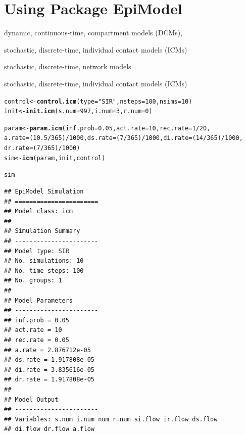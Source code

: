 \documentclass{article}\usepackage[]{graphicx}\usepackage[]{color}
\makeatletter
\newcommand{\hlnum}[1]{\textcolor[rgb]{0.686,0.059,0.569}{#1}}%
\newcommand{\hlstr}[1]{\textcolor[rgb]{0.192,0.494,0.8}{#1}}%
\newcommand{\hlopt}[1]{\textcolor[rgb]{0,0,0}{#1}}%
\newcommand{\hlstd}[1]{\textcolor[rgb]{0.345,0.345,0.345}{#1}}%
\newcommand{\hlkwb}[1]{\textcolor[rgb]{0.69,0.353,0.396}{#1}}%
\newcommand{\hlkwc}[1]{\textcolor[rgb]{0.333,0.667,0.333}{#1}}%
\newcommand{\hlkwd}[1]{\textcolor[rgb]{0.737,0.353,0.396}{\textbf{#1}}}%
\newenvironment{kframe}{%
 \def\at@end@of@kframe{}%
 \ifinner\ifhmode%
  \def\at@end@of@kframe{\end{minipage}}%
  \begin{minipage}{\columnwidth}%
 \fi\fi%
 \def\FrameCommand##1{\hskip\@totalleftmargin \hskip-\fboxsep
 \colorbox{shadecolor}{##1}\hskip-\fboxsep
     \hskip-\linewidth \hskip-\@totalleftmargin \hskip\columnwidth}%
 \MakeFramed {\advance\hsize-\width
   \@totalleftmargin\z@ \linewidth\hsize
   \@setminipage}}%
 {\par\unskip\endMakeFramed%
 \at@end@of@kframe}
\newenvironment{knitrout}{}{} %
\makeatother
\begin{document}
\section{Using Package EpiModel}


dynamic, continuous-time, compartment models (DCMs), 

stochastic, discrete-time, individual contact models (ICMs)

stochastic, discrete-time, network models



stochastic, discrete-time, individual contact models (ICMs)

\begin{knitrout}
\color{fgcolor}\begin{kframe}
\begin{alltt}
\hlstd{control} \hlkwb{<-} \hlkwd{control.icm}\hlstd{(}\hlkwc{type} \hlstd{=} \hlstr{"SIR"}\hlstd{,} \hlkwc{nsteps} \hlstd{=} \hlnum{100}\hlstd{,} \hlkwc{nsims} \hlstd{=} \hlnum{10}\hlstd{)}
\hlstd{init} \hlkwb{<-} \hlkwd{init.icm}\hlstd{(}\hlkwc{s.num} \hlstd{=} \hlnum{997}\hlstd{,} \hlkwc{i.num} \hlstd{=} \hlnum{3}\hlstd{,} \hlkwc{r.num} \hlstd{=} \hlnum{0}\hlstd{)}

\hlstd{param} \hlkwb{<-} \hlkwd{param.icm}\hlstd{(}\hlkwc{inf.prob} \hlstd{=} \hlnum{0.05}\hlstd{,} \hlkwc{act.rate} \hlstd{=} \hlnum{10}\hlstd{,} \hlkwc{rec.rate} \hlstd{=} \hlnum{1}\hlopt{/}\hlnum{20}\hlstd{,}
    \hlkwc{a.rate} \hlstd{= (}\hlnum{10.5}\hlopt{/}\hlnum{365}\hlstd{)}\hlopt{/}\hlnum{1000}\hlstd{,} \hlkwc{ds.rate} \hlstd{= (}\hlnum{7}\hlopt{/}\hlnum{365}\hlstd{)}\hlopt{/}\hlnum{1000}\hlstd{,} \hlkwc{di.rate} \hlstd{= (}\hlnum{14}\hlopt{/}\hlnum{365}\hlstd{)}\hlopt{/}\hlnum{1000}\hlstd{,}
    \hlkwc{dr.rate} \hlstd{= (}\hlnum{7}\hlopt{/}\hlnum{365}\hlstd{)}\hlopt{/}\hlnum{1000}\hlstd{)}
\hlstd{sim} \hlkwb{<-} \hlkwd{icm}\hlstd{(param, init, control)}

\hlstd{sim}
\end{alltt}
\begin{verbatim}
## EpiModel Simulation
## =======================
## Model class: icm
## 
## Simulation Summary
## -----------------------
## Model type: SIR
## No. simulations: 10
## No. time steps: 100
## No. groups: 1
## 
## Model Parameters
## -----------------------
## inf.prob = 0.05
## act.rate = 10
## rec.rate = 0.05
## a.rate = 2.876712e-05
## ds.rate = 1.917808e-05
## di.rate = 3.835616e-05
## dr.rate = 1.917808e-05
## 
## Model Output
## -----------------------
## Variables: s.num i.num num r.num si.flow ir.flow ds.flow 
## di.flow dr.flow a.flow
\end{verbatim}
\end{kframe}
\end{knitrout}
\end{document}
